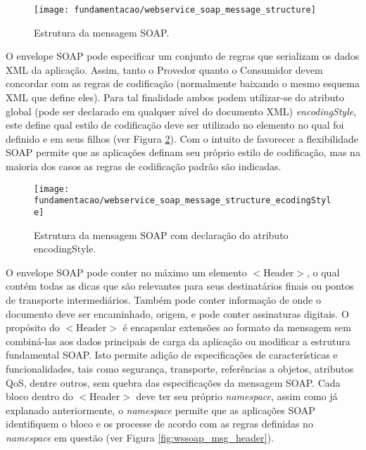 \begin{figure}[!htb] \centering
  \centering
  \texttt{[image: fundamentacao/webservice\_soap\_message\_structure]} 
  \caption{Estrutura da mensagem SOAP.\cite{Papazoglou:2008}} 
  \label{fig:wssoap_msg}
\end{figure}

O envelope SOAP pode especificar um conjunto de regras que serializam os dados XML da aplicação. Assim, tanto o Provedor quanto o Consumidor devem concordar com as regras de codificação (normalmente baixando o mesmo esquema XML que define eles). Para tal finalidade ambos podem utilizar-se do atributo global (pode ser declarado em qualquer nível do documento XML) \textit{encodingStyle}, este define qual estilo de codificação deve ser utilizado no elemento no qual foi definido e em seus filhos (ver Figura \ref{fig:wssoap_msg_ecodingStyle}). Com o intuito de favorecer a flexibilidade SOAP permite que as aplicações definam seu próprio estilo de codificação, mas na maioria dos casos as regras de codificação padrão são indicadas.\cite{Papazoglou:2008}

\begin{figure}[!htb] \centering
  \centering
  \texttt{[image: fundamentacao/webservice\_soap\_message\_structure\_ecodingStyle]} 
  \caption{Estrutura da mensagem SOAP com declaração do atributo encodingStyle.\cite{Papazoglou:2008}} 
  \label{fig:wssoap_msg_ecodingStyle}
\end{figure}

O envelope SOAP pode conter no máximo um elemento $<$Header$>$, o qual contém todas as dicas que são relevantes para seus destinatários finais ou pontos de transporte intermediários. Também pode conter informação de onde o documento deve ser encaminhado, origem, e pode conter assinaturas digitais. O propósito do $<$Header$>$ é encapsular extensões ao formato da mensagem sem combiná-las aos dados principais de carga da aplicação ou modificar a estrutura fundamental SOAP. Isto permite adição de especificações de características e funcionalidades, tais como segurança, transporte, referências a objetos, atributos QoS\footnotemark {}, dentre outros, sem quebra das especificações da mensagem SOAP. Cada bloco dentro do $<$Header$>$ deve ter seu próprio \textit{namespace}, assim como já explanado anteriormente, o \textit{namespace} permite que as aplicações SOAP identifiquem o bloco e os processe de acordo com as regras definidas no \textit{namespace} em questão (ver Figura \ref{fig:wssoap_msg_header}).\cite{Papazoglou:2008}

